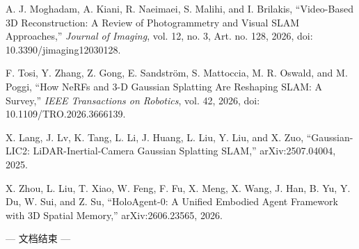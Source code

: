 \documentclass[11pt,a4paper,fontset=none]{ctexart}
\begin{document}
\begin{enumerate}[label={[\arabic*]}]
  \item A. J. Moghadam, A. Kiani, R. Naeimaei, S. Malihi, and I. Brilakis, ``Video-Based 3D Reconstruction: A Review of Photogrammetry and Visual SLAM Approaches,'' \emph{Journal of Imaging}, vol. 12, no. 3, Art. no. 128, 2026, doi: 10.3390/jimaging12030128.
  \item F. Tosi, Y. Zhang, Z. Gong, E. Sandstr\"om, S. Mattoccia, M. R. Oswald, and M. Poggi, ``How NeRFs and 3-D Gaussian Splatting Are Reshaping SLAM: A Survey,'' \emph{IEEE Transactions on Robotics}, vol. 42, 2026, doi: 10.1109/TRO.2026.3666139.
  \item X. Lang, J. Lv, K. Tang, L. Li, J. Huang, L. Liu, Y. Liu, and X. Zuo, ``Gaussian-LIC2: LiDAR-Inertial-Camera Gaussian Splatting SLAM,'' arXiv:2507.04004, 2025.
  \item X. Zhou, L. Liu, T. Xiao, W. Feng, F. Fu, X. Meng, X. Wang, J. Han, B. Yu, Y. Du, W. Sui, and Z. Su, ``HoloAgent-0: A Unified Embodied Agent Framework with 3D Spatial Memory,'' arXiv:2606.23565, 2026.
\end{enumerate}

\vfill
\begin{center}
\color{muted}\sffamily\small
— 文档结束 —
\end{center}
\end{document}

